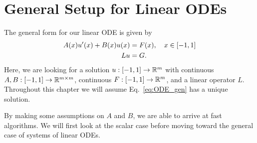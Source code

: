 \section{General Setup for Linear ODEs}
\label{sec:ODE_general_setup}

The general form for our linear ODE is given by
%
\begin{align}
    A(x)u'(x) + B(x)u(x) &= F(x), \quad x\in\left[ -1,1 \right]  \nonumber\\
    Lu &= G.
    \label{eq:ODE_gen}
\end{align}
%
Here, we are looking for a solution $u:\left[ -1,1 \right]\to\mathbb{R}^{m}$ with continuous
$A,B:[-1,1]\to\mathbb{R}^{m\times m}$, continuous $F:\left[ -1,1 \right]\to\mathbb{R}^{m}$,
and a linear operator $L$.
Throughout this chapter we will assume Eq.~\eqref{eq:ODE_gen}
has a unique solution.

By making some assumptions on $A$ and $B$, we are able to arrive
at fast algorithms. We will first look at the scalar case
before moving toward the general case of systems of linear ODEs.

